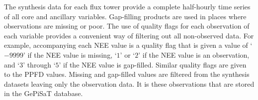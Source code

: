 The synthesis data for each flux tower provide a complete half-hourly time series of all core and ancillary variables.  
Gap-filling products are used in places where observations are missing or poor.  
The use of quality flags for each observation of each variable provides a convenient way of filtering out all non-observed data.  
For example, accompanying each NEE value is a quality flag that is given a value of `$-9999$' if the NEE value is missing, `$1$' or `$2$' if the NEE value is an observation, and `$3$' through `$5$' if the NEE value is gap-filled. 
Similar quality flags are given to the PPFD values.  
Missing and gap-filled values are filtered from the synthesis datasets leaving only the observation data.  
It is these observations that are stored in the GePiSaT database.

